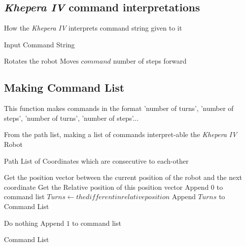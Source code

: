\subsection{\textit{Khepera IV} command interpretations}
\label{function:command_interpretation}
\begin{algorithm}
\caption{How the \textit{Khepera IV} interprets command string given to it}
\begin{algorithmic}


\REQUIRE Input Command String

        \STATE Rotates the robot 
        \STATE Moves $command$ number of steps forward
\ENDIF
\ENDFOR
\end{algorithmic}
\end{algorithm}




\subsection{Making Command List}

This function makes commands in the format 'number of turns', 'number of steps', 'number of turns', 'number of steps'...

\label{function:make_command_list}
\begin{algorithm}
\caption{From the path list, making a list of commands interpret-able the \textit{Khepera IV} Robot}
\begin{algorithmic}
\REQUIRE Path List of Coordinates which are consecutive to each-other

    \STATE Get the position vector between the current position of the robot and the next coordinate
    \STATE Get the Relative position of this position vector
        \STATE Append $0$ to command list
        \STATE $Turns \leftarrow the different in relative position$
        \STATE Append $Turns$ to Command List 
    
    
        \STATE Do nothing
        \STATE Append $1$ to command list
    
    
\ENDIF
\ENDFOR

\RETURN Command List


\end{algorithmic}
\end{algorithm}



